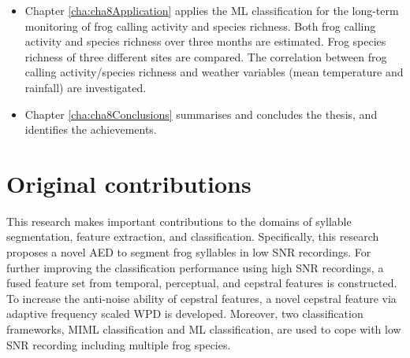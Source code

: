 \begin{itemize}
\item Chapter \ref{cha:cha8Application} applies the ML classification for the long-term monitoring of frog calling activity and species richness.
Both frog calling activity and species richness over three months are estimated. Frog species richness of three different sites are compared.  
The correlation between frog calling activity/species richness and weather variables (mean temperature and rainfall) are investigated. 




\item  Chapter \ref{cha:cha8Conclusions} summarises and concludes the thesis, and identifies the achievements.

\end{itemize}

\section{Original contributions}
This research makes important contributions to the domains of syllable segmentation, feature extraction, and classification. Specifically, this research proposes a novel AED to segment frog syllables in low SNR recordings. For further improving the classification performance using high SNR recordings, a fused feature set from temporal, perceptual, and cepstral features is constructed. To increase the anti-noise ability of cepstral features, a novel cepstral feature via adaptive frequency scaled WPD is developed. Moreover, two classification frameworks, MIML classification and ML classification, are used to cope with low SNR recording including multiple frog species.


